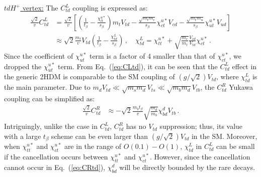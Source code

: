\documentclass[prd,preprint,superscriptaddress,amsmath,amssymb]{revtex4}
\begin{document}
   \underline {$td H^+$ vertex:}  The $C^L_{td}$ coupling is expressed as:
 \begin{align}
 \frac{\sqrt{2}}{v} C^L_{td} & = \frac{\sqrt{2}}{v} \left[ \left( \frac{1}{t_\beta} - \frac{\chi^{u*}_{tt} }{s_\beta}\right) m_t V_{td} - \frac{\sqrt{m_t m_c}}{s_\beta} \chi^{u*}_{ct} V_{cd} - \frac{\sqrt{m_t m_u}}{s_\beta} \chi^{u*}_{ut} V_{ud}\right] \nonumber \\
 & \approx  \sqrt{2} \frac{m_t}{v } V_{td} \left( \frac{1}{t_\beta} - \frac{\chi^L_{td}}{s_\beta}  \right)\,, \quad \chi^L_{td} = \chi^{u*}_{tt} +\sqrt{\frac{m_c}{m_t}} \frac{V_{cd}}{V_{td}} \chi^{u*}_{ct}\,. \label{eq:CLtd}
 \end{align}
Since the coefficient of  $\chi^{u*}_{ut}$ term  is a factor of 4 smaller than that of  $\chi^{u*}_{ct}$, we  dropped the $\chi^{u*}_{ut}$ term. From Eq.~(\ref{eq:CLtd}), it can be seen that the $C^L_{td}$ effect in the generic 2HDM is comparable to the SM coupling of $(g/\sqrt{2})V_{td}$, where $\chi^L_{td}$ is the main parameter. 
Due to $m_d V_{td} \ll \sqrt{m_s m_d} V_{ts}  \ll \sqrt{m_b m_d} V_{tb}$,  the  $C^R_{td}$ Yukawa coupling can be simplified  as:
 \begin{align}
 \frac{\sqrt{2}}{v} C^R_{td} 
 & \approx - \sqrt{2} \frac{m_b t_\beta }{v }  \sqrt{\frac{ m_d}{m_b}}\chi^d_{bd} V_{tb}\,. \label{eq:CRtd}
 \end{align}
 Intriguingly, unlike the case in $C^L_{td}$,  $C^R_{td}$ has no $V_{td}$ suppression; thus, its value  with a large $t_\beta$ scheme can be even larger than $(g/\sqrt{2}) V_{td}$ in the SM. Moreover, when $\chi^{u*}_{tt}$ and $\chi^{u*}_{ct}$ are  in the range of  $O(0.1)-O(1)$, $\chi^{L}_{td}$ in $C^L_{td}$ can be small  if the cancellation occurs between $\chi^{u*}_{tt}$ and $\chi^{u*}_{ct}$. However, since the cancellation cannot occur in Eq.~(\ref{eq:CRtd}), $\chi^d_{bd}$ will be directly bounded by the rare decays. 
 
\end{document}
